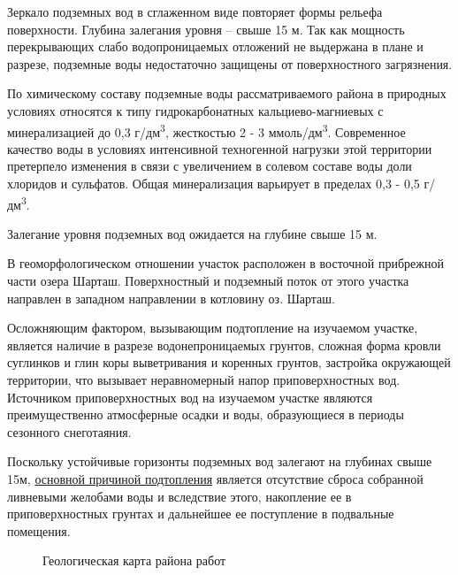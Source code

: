 \documentclass[a4paper,12pt]{article} %
\begin{document}
Зеркало подземных вод в сглаженном виде повторяет формы рельефа поверхности. Глубина залегания уровня – свыше 15 м. Так как мощность перекрывающих слабо водопроницаемых отложений не выдержана в плане и разрезе, подземные воды недостаточно защищены от поверхностного загрязнения.

По химическому составу подземные воды рассматриваемого района в природных условиях относятся к типу гидрокарбонатных кальциево-магниевых с минерализацией до 0,3 г/дм\textsuperscript{3}, жесткостью 2 - 3 ммоль/дм\textsuperscript{3}. Современное качество воды в условиях интенсивной техногенной нагрузки этой территории претерпело изменения в связи с увеличением в солевом составе воды доли хлоридов и сульфатов. Общая минерализация варьирует в пределах 0,3 - 0,5 г/дм\textsuperscript{3}.

Залегание уровня подземных вод ожидается на глубине свыше 15 м.

В геоморфологическом отношении участок расположен в восточной прибрежной части озера Шарташ. Поверхностный и подземный поток от этого участка направлен в западном направлении в котловину оз. Шарташ.

Осложняющим фактором, вызывающим подтопление на изучаемом участке, является наличие в разрезе водонепроницаемых грунтов, сложная форма кровли суглинков и глин коры выветривания и коренных грунтов, застройка окружающей территории, что вызывает неравномерный напор приповерхностных вод. Источником приповерхностных вод на изучаемом участке являются преимущественно атмосферные осадки и воды, образующиеся в периоды сезонного снеготаяния.

Поскольку устойчивые горизонты подземных вод залегают на глубинах свыше 15\-м, \underline{основной причиной подтопления} является отсутствие сброса собранной ливневыми желобами воды и вследствие этого, накопление ее в приповерхностных грунтах и дальнейшее ее поступление в подвальные помещения.

\begin{figure}[!h]
	\caption{Геологическая карта района работ}
\end{figure}
\end{document}
